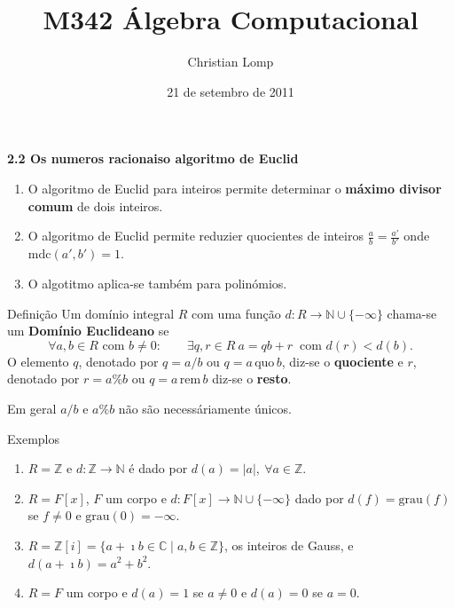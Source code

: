 \documentclass[handout]{beamer}
\title[M342]{M342 Álgebra Computacional}
\author{Christian Lomp}
\institute{FCUP}
\date{21 de setembro de 2011}
\newcommand{\ZZ}{\mathbb Z}
\newcommand{\NN}{\mathbb N}
\newcommand{\CC}{\mathbb C}
\newcommand{\grau}[1]{\mathrm{grau}({#1})}
\newcommand{\mdc}[2]{\mathrm{mdc}({#1}, {#2})}
\newcommand{\quo}[2]{{#1}\, \mathrm{quo} \, {#2}}
\newcommand{\rem}[2]{{#1}\, \mathrm{rem} \, {#2}}
\begin{document}
\begin{frame}
\titlepage
\end{frame}






\begin{frame}{\bf 2.2 Os numeros racionais}{\bf {o algoritmo de Euclid}}
\begin{enumerate}
\item O algoritmo de Euclid para inteiros permite determinar o {\bf máximo divisor comum} de dois inteiros.\pause
\item O algoritmo de Euclid permite reduzier quocientes de inteiros $\frac{a}{b} = \frac{a'}{b'}$ onde $\mdc{a'}{b'}=1$.\pause
\item O algotitmo aplica-se também para polinómios.
\end{enumerate}
\end{frame}

\begin{frame}
\begin{block}{Definição} Um domínio integral $R$ com uma função $d:R\rightarrow \NN\cup\{-\infty\}$  chama-se um {\bf Domínio Euclideano} se 
$$\forall a,b \in R \mbox{ com } b\neq 0: \qquad \exists q,r \in R \: a=qb+r \:\mbox{ com } d(r)<d(b).$$
\pause
O elemento $q$, denotado por $q=a/b$ ou $q=\quo{a}{b}$, diz-se o {\bf quociente} e $r$, denotado por $r=a\%b$ ou $q=\rem{a}{b}$ diz-se o {\bf resto}. 

\pause Em geral $a/b$ e $a\%b$ não são necessáriamente únicos.
\end{block}
\end{frame}

\begin{frame}
\begin{block}{Exemplos}
\begin{enumerate}
\item $R=\ZZ$ e $d:\ZZ \rightarrow \NN$ é dado por $d(a)=|a|, \: \forall a\in \ZZ$.\pause
\item $R=F[x]$, $F$ um corpo e $d:F[x] \rightarrow \NN\cup \{-\infty\}$  dado por $d(f)=\grau{f}$ se $f\neq 0$ e $\grau{0}=-\infty$.\pause
\item $R=\ZZ[i] = \{a+\imath b\in\CC \mid a,b\in\ZZ\}$, os inteiros de Gauss, e $d(a+\imath b) = a^2+b^2$.\pause
\item $R=F$ um corpo e $d(a)=1$ se $a\neq 0$ e $d(a)=0$ se $a=0$.
\end{enumerate}
\end{block}
\end{frame}
\end{document}
